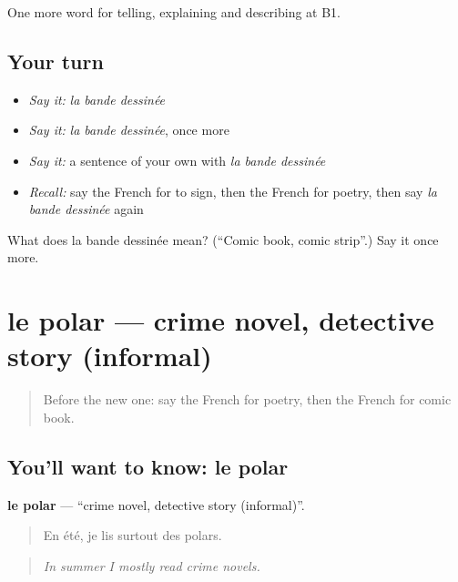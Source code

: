 \begin{grammarlens}[title={What you've built}]
One more word for telling, explaining and describing at B1.
\end{grammarlens}

\subsection*{Your turn}
\begin{itemize}
\raggedright
  \item \emph{Say it:} \emph{la bande dessinée}
  \item \emph{Say it:} \emph{la bande dessinée}, once more
  \item \emph{Say it:} a sentence of your own with \emph{la bande dessinée}
  \item \emph{Recall:} say the French for to sign, then the French for poetry, then say \emph{la bande dessinée} again
\end{itemize}

\begin{tcolorbox}[breakable,colback=teal!4,colframe=teal!35!black,title={Before you move on}]
What does la bande dessinée mean? (\textquotedblleft{}Comic book, comic strip\textquotedblright{}.) Say it once more.
\end{tcolorbox}
\section[le polar]{le polar — crime novel, detective story (informal)}

\label{lesson:FR-C522-polar}



\begin{quote}
Before the new one: say the French for poetry, then the French for comic book.
\end{quote}

\subsection*{You'll want to know: le polar}
\textbf{le polar} — \textquotedblleft{}crime novel, detective story (informal)\textquotedblright{}.

\begin{quote}
En été, je lis surtout des polars.
\end{quote}

\begin{quote}
\emph{In summer I mostly read crime novels.}
\end{quote}

